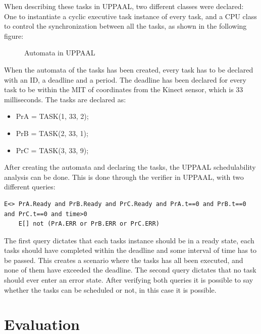 When describing these tasks in UPPAAL, two different classes were declared: One to instantiate a cyclic executive task instance of every task, and a CPU class to control the synchronization between all the tasks, as shown in the following figure:

\begin{figure}[h]
	\centering
	\caption{Automata in UPPAAL}
	\label{robot}
\end{figure}

When the automata of the tasks has been created, every task has to be declared with an ID, a deadline and a period. The deadline has been declared for every task to be within the MIT of coordinates from the Kinect sensor, which is 33 milliseconds.
The tasks are declared as:

\begin{itemize}
	\item PrA = TASK(1, 33, 2);
	\item PrB = TASK(2, 33, 1);
	\item PrC = TASK(3, 33, 9);
\end{itemize}

After creating the automata and declaring the tasks, the UPPAAL schedulability analysis can be done. This is done through the verifier in UPPAAL, with two different queries:

\begin{lstlisting}[caption={Queries for UPPAAL}, label={Queries}]
	E<> PrA.Ready and PrB.Ready and PrC.Ready and PrA.t==0 and PrB.t==0 and PrC.t==0 and time>0
	E[] not (PrA.ERR or PrB.ERR or PrC.ERR)
\end{lstlisting}

The first query dictates that each tasks instance should be in a ready state, each tasks should have completed within the deadline and some interval of time has to be passed. This creates a scenario where the tasks has all been executed, and none of them have exceeded the deadline.
The second query dictates that no task should ever enter an error state.
After verifying both queries it is possible to say whether the tasks can be scheduled or not, in this case it is possible.

\section{Evaluation}
\label{sec:i3Evaluation}

